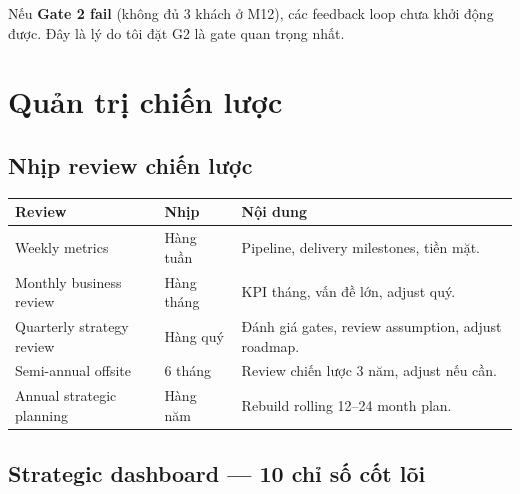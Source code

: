 \documentclass[11pt,a4paper]{article}
\begin{document}
\begin{warnbox}[title=Điều kiện để feedback loop hoạt động]
Nếu \textbf{Gate 2 fail} (không đủ 3 khách ở M12), các feedback loop chưa khởi
động được. Đây là lý do tôi đặt G2 là gate quan trọng nhất.
\end{warnbox}

\clearpage

\section{Quản trị chiến lược}

\subsection{Nhịp review chiến lược}

\begin{tabularx}{\linewidth}{@{}p{3.5cm} p{2cm} X@{}}
\toprule
\textbf{Review} & \textbf{Nhịp} & \textbf{Nội dung} \\
\midrule
Weekly metrics & Hàng tuần & Pipeline, delivery milestones, tiền mặt. \\
Monthly business review & Hàng tháng & KPI tháng, vấn đề lớn, adjust quý. \\
Quarterly strategy review & Hàng quý & Đánh giá gates, review assumption, adjust roadmap. \\
Semi-annual offsite & 6 tháng & Review chiến lược 3 năm, adjust nếu cần. \\
Annual strategic planning & Hàng năm & Rebuild rolling 12--24 month plan. \\
\bottomrule
\end{tabularx}

\subsection{Strategic dashboard --- 10 chỉ số cốt lõi}
\end{document}
